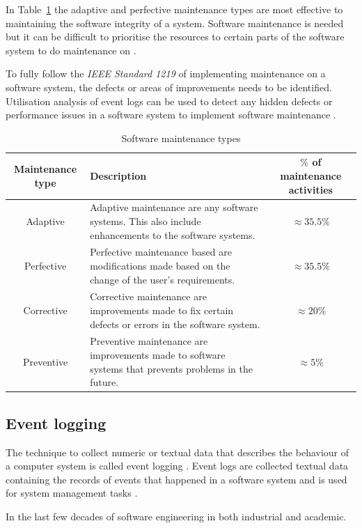 In Table~\ref{tbl:CH1_MaintenanceTypes} the adaptive and perfective maintenance types are most effective to maintaining the software integrity of a system. Software maintenance is needed but it can be difficult to prioritise the resources to certain parts of the software system to do maintenance on \cite{Mamone1994, Hasan2012}.\par To fully follow the \textit{IEEE Standard 1219} of implementing maintenance on a software system, the defects or areas of improvements needs to be identified. Utilisation analysis of event logs can be used to detect any hidden defects or performance issues in a software system to implement software maintenance \cite{Cinque2013, Rong2018a}.

\clearpage

\begin{table}[!htb]
    \centering
    \small
    \caption{Software maintenance types}
    \label{tbl:CH1_MaintenanceTypes}
    \begin{tabularx}{\textwidth}{|c|X|c|}
        \hline
        \textbf{Maintenance type} & \textbf{Description} & \textbf{$\%$ of maintenance activities} \\ \hline
        Adaptive & \raggedright Adaptive maintenance are any software systems. This also include enhancements to the software systems. & $\approx 35.5\%$ \\ \hline
        Perfective & Perfective maintenance based are modifications made based on the change of the user's requirements. & $\approx 35.5\%$ \\ \hline
        Corrective & \raggedright Corrective maintenance are improvements made to fix certain defects or errors in the software system. & $\approx 20\%$ \\ \hline
        Preventive & \raggedright  Preventive maintenance are improvements made to software systems that prevents problems in the future. & $\approx 5\%$ \\ \hline
    \end{tabularx}
\end{table}

\subsection{Event logging}
The technique to collect numeric or textual data that describes the behaviour of a computer system is called event logging \cite{Pecchia2015, Baccanico2014}. Event logs are collected textual data containing the records of events that happened in a software system and is used for system management tasks \cite{Rong2018a, Rong2018, Baccanico2014}.\par In the last few decades of software engineering in both industrial and academic.

